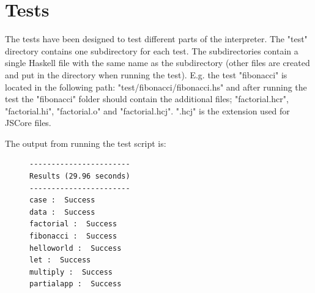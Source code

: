 \section{Tests}

The tests have been designed to test different parts of the interpreter.
The "test" directory contains one subdirectory for each test. The
subdirectories contain a single Haskell file with the same name as the
subdirectory (other files are created and put in the directory when running
the test). E.g. the test "fibonacci" is located in the following path:
"test/fibonacci/fibonacci.hs" and after running the test the "fibonacci"
folder should contain the additional files; "factorial.hcr", "factorial.hi",
"factorial.o" and "factorial.hcj". ".hcj" is the extension used for JSCore
files.

The output from running the test script is:

\begin{figure}[H]
\lstset{ %
language=Python,
caption=Output from running the test script,
label=lst:testoutput
}
\begin{lstlisting}
-----------------------
Results (29.96 seconds)
-----------------------
case :  Success
data :  Success
factorial :  Success
fibonacci :  Success
helloworld :  Success
let :  Success
multiply :  Success
partialapp :  Success
\end{lstlisting}
\end{figure}

